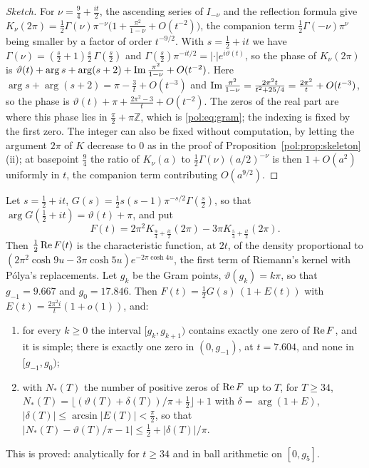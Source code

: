\begin{proof}[Sketch]
For $\nu=\frac94+\frac{it}2$, the ascending series of $I_{-\nu}$ and the reflection formula give $K_\nu(2\pi)=\frac12\Gamma(\nu)\pi^{-\nu}\big(1+\frac{\pi^2}{1-\nu}+O(t^{-2})\big)$, the companion term $\frac12\Gamma(-\nu)\pi^\nu$ being smaller by a factor of order $t^{-9/2}$. With $s=\frac12+it$ we have $\Gamma(\nu)=(\frac s2+1)\frac s2\,\Gamma(\frac s2)$ and $\Gamma(\frac s2)\pi^{-it/2}=|\cdot|e^{i\vartheta(t)}$, so the phase of $K_\nu(2\pi)$ is $\vartheta(t)+\arg s+\arg(s+2)+\operatorname{Im}\frac{\pi^2}{1-\nu}+O(t^{-2})$. Here $\arg s+\arg(s+2)=\pi-\frac3t+O(t^{-3})$ and $\operatorname{Im}\frac{\pi^2}{1-\nu}=\frac{2\pi^2t}{t^2+25/4}=\frac{2\pi^2}{t}+O(t^{-3})$, so the phase is $\vartheta(t)+\pi+\frac{2\pi^2-3}{t}+O(t^{-2})$. The zeros of the real part are where this phase lies in $\frac\pi2+\pi\mathbb Z$, which is \eqref{pol:eq:gram}; the indexing is fixed by the first zero. The integer can also be fixed without computation, by letting the argument $2\pi$ of $K$ decrease to $0$ as in the proof of Proposition~\ref{pol:prop:skeleton}(ii); at basepoint $\frac94$ the ratio of $K_\nu(a)$ to $\frac12\Gamma(\nu)(a/2)^{-\nu}$ is then $1+O(a^2)$ uniformly in $t$, the companion term contributing $O(a^{9/2})$.
\end{proof}

\begin{theorem}\label{pol:thm:gramexact}
Let $s=\frac12+it$, $G(s)=\frac12s(s-1)\pi^{-s/2}\Gamma(\frac s2)$, so that $\arg G(\frac12+it)=\vartheta(t)+\pi$, and put
\[
F(t)=2\pi^2K_{\frac94+\frac{it}2}(2\pi)-3\pi K_{\frac54+\frac{it}2}(2\pi).
\]
Then $\frac12\operatorname{Re} F(t)$ is the characteristic function, at $2t$, of the density proportional to $(2\pi^2\cosh9u-3\pi\cosh5u)e^{-2\pi\cosh4u}$, the first term of Riemann's kernel with P\'olya's replacements. Let $g_k$ be the Gram points, $\vartheta(g_k)=k\pi$, so that $g_{-1}=9.667$ and $g_0=17.846$. Then $F(t)=\frac12G(s)\,(1+E(t))$ with $E(t)=\frac{2\pi^2i}t(1+o(1))$, and:
\begin{enumerate}
\item[(i)] for every $k\ge0$ the interval $[g_k,g_{k+1})$ contains exactly one zero of $\operatorname{Re} F$, and it is simple; there is exactly one zero in $(0,g_{-1})$, at $t=7.604$, and none in $[g_{-1},g_0)$;
\item[(ii)] with $N_*(T)$ the number of positive zeros of $\operatorname{Re} F$ up to $T$, for $T\ge34$, $N_*(T)=\lfloor(\vartheta(T)+\delta(T))/\pi+\frac12\rfloor+1$ with $\delta=\arg(1+E)$, $|\delta(T)|\le\arcsin|E(T)|<\frac\pi2$, so that $|N_*(T)-\vartheta(T)/\pi-1|\le\frac12+|\delta(T)|/\pi$.
\end{enumerate}
This is proved: analytically for $t\ge34$ and in ball arithmetic on $[0,g_5]$.
\end{theorem}

